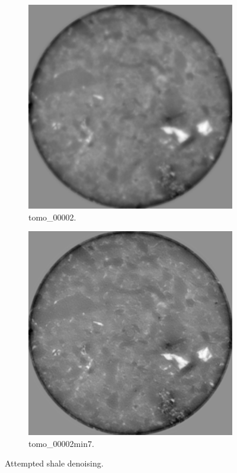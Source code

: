 \begin{figure}
  \medskip

  \begin{subfigure}[t]{.45\textwidth}
    \centering
    \includegraphics[width=\linewidth]{figures/shale/shale_dn_tomo00002/0.png}
    \caption{tomo\_00002. }
  \end{subfigure}
  \hfill
  \begin{subfigure}[t]{.45\textwidth}
    \centering
    \includegraphics[width=\linewidth]{figures/shale/shale_dn_tomo00002min7/0.png}
    \caption{tomo\_00002min7. }
  \end{subfigure}
  \caption[Attempted shale denoising]{Attempted shale denoising. }
  \label{fig:shale}
\end{figure}




